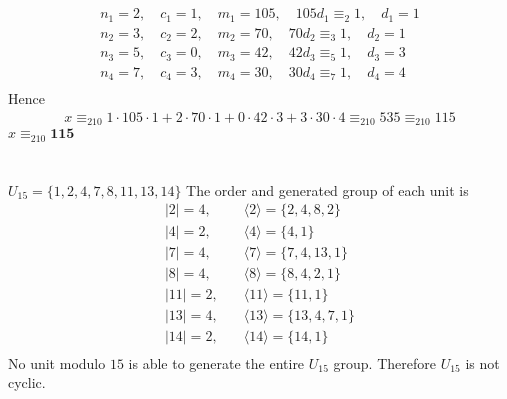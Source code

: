 \documentclass{article}
\begin{document}
\newpage
\section{}
\[
\begin{split}
n_{1} = 2, \quad
c_{1} = 1, \quad
m_{1} = 105, \quad
105d_{1} \equiv_{2} 1,\quad
d_{1} = 1 \\
n_{2} = 3, \quad
c_{2} = 2, \quad
m_{2} = 70, \quad
70d_{2} \equiv_{3} 1,\quad
d_{2} = 1 \\
n_{3} = 5, \quad
c_{3} = 0, \quad
m_{3} = 42, \quad
42d_{3} \equiv_{5} 1,\quad
d_{3} = 3 \\
n_{4} = 7, \quad
c_{4} = 3, \quad
m_{4} = 30, \quad
30d_{4} \equiv_{7} 1,\quad
d_{4} = 4 \\
\end{split}
\]
Hence
\[
\begin{split}
x \equiv_{210}
1 \cdot 105 \cdot 1 +
2 \cdot 70 \cdot 1 + 
0 \cdot 42 \cdot 3 +
3 \cdot 30 \cdot 4
\equiv_{210}
535
\equiv_{210}
115
\end{split}
\]
$x \equiv_{210} \textbf{115}$

\newpage
\section{}
$U_{15} = \{1, 2, 4, 7, 8, 11, 13, 14\}$
The order and generated group of each unit is
\[
\begin{split}
|2| = 4, \quad &\langle 2 \rangle = \{2,4,8,2\} \\
|4| = 2, \quad &\langle 4 \rangle = \{4, 1\} \\
|7| = 4, \quad &\langle 7 \rangle = \{7, 4, 13, 1\} \\
|8| = 4, \quad &\langle 8 \rangle = \{8, 4, 2, 1\} \\
|11| = 2, \quad &\langle 11 \rangle = \{11, 1\}\\
|13| = 4, \quad &\langle 13 \rangle = \{13, 4, 7, 1\}\\
|14| = 2, \quad &\langle 14 \rangle = \{14, 1\} \\
\end{split}
\]
No unit modulo $15$ is able to generate the entire $U_{15}$ group.
Therefore $U_{15}$ is not cyclic.


\newpage
\end{document}
